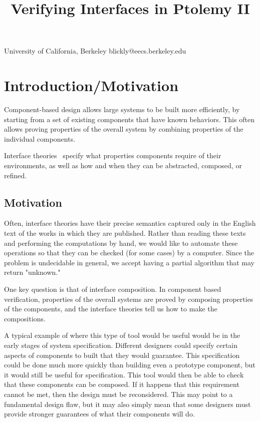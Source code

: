 \documentclass[preprint,11pt]{sigplanconf}
\begin{document}
\title{Verifying Interfaces in Ptolemy II}

           {University of California, Berkeley} {blickly@eecs.berkeley.edu}

\maketitle

\newcommand{\fixme}[1]{\textcolor{red}{(FIXME: #1)}}

\begin{abstract}
\end{abstract}

\section{Introduction/Motivation}
Component-based design allows large systems to be built more efficiently, by
starting from a set of existing components that have known behaviors. This
often allows proving properties of the overall system by combining properties
of the individual components.

Interface theories~\cite{interfaceTheories} specify what properties components
require of their environments, as well as how and when they can be abstracted,
composed, or refined.
\subsection{Motivation}
Often, interface theories have their precise semantics captured only in the
English text of the works in which they are published. Rather than reading these
texts and performing the computations by hand, we would like to automate these
operations so that they can be checked (for some cases) by a computer. Since the
problem is undecidable in general, we accept having a partial algorithm that may
return "unknown."

One key question is that of interface composition.  In component based
verification, properties of the overall systems are proved by composing
properties of the components, and the interface theories tell us how to make
the compositions.

A typical example of where this type of tool would be useful would be in the
early stages of system specification.
Different designers could specify certain aspects of components to built that
they would guarantee.
This specification could be done much more quickly than building even a
prototype component, but it would still be useful for specification.
This tool would then be able to check that these components can be composed.
If it happens that this requirement cannot be met, then the design must be
reconsidered.
This may point to a fundamental design flaw, but it may also simply mean that
some designers must provide stronger guarantees of what their components will
do.
\end{document}
